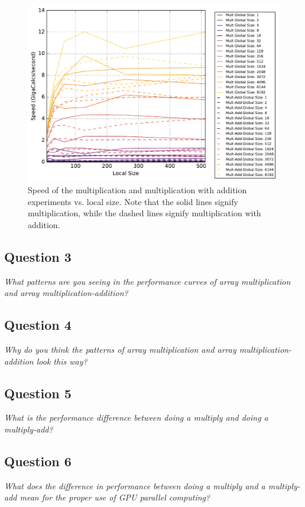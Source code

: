 \documentclass{article}
\begin{document}
\begin{figure}[h]
	\centering
        \includegraphics[width=0.7\linewidth]{Mult_Localsize.pdf}
        \caption{Speed of the multiplication and multiplication with addition experiments vs. local size.  Note that the solid lines signify multiplication, while the dashed lines signify multiplication with addition.}
        \label{fig:MultLocal}
\end{figure}

\subsection*{Question 3}
\textit{What patterns are you seeing in the performance curves of array multiplication and array multiplication-addition?}



\subsection*{Question 4}
\textit{Why do you think the patterns of array multiplication and array multiplication-addition look this way?}



\subsection*{Question 5}
\textit{What is the performance difference between doing a multiply and doing a multiply-add?}



\subsection*{Question 6}
\textit{What does the difference in performance between doing a multiply and a multiply-add mean for the proper use of GPU parallel computing?}
\end{document}

